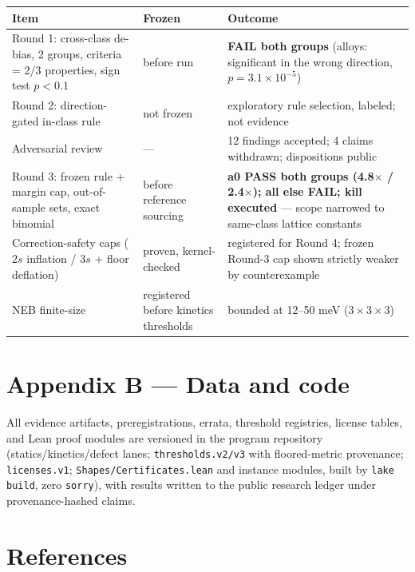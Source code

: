 \documentclass[11pt]{article}
\theoremstyle{definition}
\theoremstyle{remark}
\newcommand{\code}[1]{\texttt{#1}}
\begin{document}
\begin{table}[h!]
\centering
\small
\begin{tabular}{@{}p{} p{} p{}@{}}
\toprule
Item & Frozen & Outcome \\
\midrule
Round 1: cross-class de-bias, 2 groups, criteria = 2/3 properties, sign test $p < 0.1$ & before run & \textbf{FAIL both groups} (alloys: significant in the wrong direction, $p = 3.1\times10^{-5}$) \\
\addlinespace
Round 2: direction-gated in-class rule & not frozen & exploratory rule selection, labeled; not evidence \\
\addlinespace
Adversarial review & --- & 12 findings accepted; 4 claims withdrawn; dispositions public \\
\addlinespace
Round 3: frozen rule + margin cap, out-of-sample sets, exact binomial & before reference sourcing & \textbf{a0 PASS both groups (4.8$\times$ / 2.4$\times$); all else FAIL; kill executed} --- scope narrowed to same-class lattice constants \\
\addlinespace
Correction-safety caps ($2s$ inflation / $3s$ + floor deflation) & proven, kernel-checked & registered for Round 4; frozen Round-3 cap shown strictly weaker by counterexample \\
\addlinespace
NEB finite-size & registered before kinetics thresholds & bounded at 12--50 meV ($3\times3\times3$) \\
\bottomrule
\end{tabular}
\end{table}

\section*{Appendix B --- Data and code}

All evidence artifacts, preregistrations, errata, threshold registries, license tables, and Lean proof modules are versioned in the program repository (statics/kinetics/defect lanes; \code{thresholds.v2/v3} with floored-metric provenance; \code{licenses.v1}; \code{Shapes/Certificates.lean} and instance modules, built by \code{lake build}, zero \code{sorry}), with results written to the public research ledger under provenance-hashed claims.

\section*{References}
\end{document}
